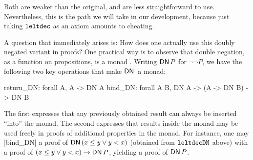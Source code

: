 \documentclass[runningheads]{llncs}
\newcommand{\Exists}[2]{\exists_{#1} \, . \, #2}
\newcommand{\weg}[1]{}
\newcommand{\DN}{{\sf DN}\,}
\newcommand{\IR}{{\mathbf R}}
\newcommand{\Inv}{{\rm Inv}}
\newcommand{\contrans}{\rightarrow_C}
\newcommand{\Dur}{{\IR_{\geq 0}}}
\newcommand{\leltdec}{{\tt leltdec}}
\newcommand{\leltdecDN}{{\tt leltdecDN}}
\begin{document}
Both are weaker than the original, and are less straightforward to
use. Nevertheless, this is the path we will take in our development,
because just taking $\leltdec$ as an axiom amounts to cheating.
\weg{ 
A place where we definitely need the stability of the invariant is in
proving the obvious and useful property of {\em transitivity of the
  continuous transition relation}: Suppose we have $(l, p) \contrans
(l, p')$ and $(l, p')\contrans (l, p'')$ for location $l$ and points
$p, p', p''$. 
To show $(l, p)\contrans (l, p'')$, we must show (among other things)
that the invariant holds at each point along the way. That is,
$$\forall t, 0 \leq t \leq d + d' \rightarrow \Inv_l( \Phi_L(p, t)).$$
We know this is true for $0 \leq t \leq d$, and we know that this is
true for $d \leq t \leq d + d'$. Classically, then, the proof is done,
for one can simply distinguish cases $t \leq d$ or $d < t$.  In our
transitivity proof, we will use the variant expressed using double
negation. Now we need only observe that $x \leq y$ is equivalent to $\neg(y < x)$, and that the law of the excluded middle holds under double negation. That is,
$\forall P( \neg  \neg  (P \vee \neg  P))$
is a trivial tautology.
}
A question that immediately arises is: How does one actually use this
doubly negated variant in proofs?  One practical way is to observe
that double negation, as a function on propositions, is a monad
\cite{wadler95monads}. Writing $\DN P$ for $\neg  \neg  P$, we have the following two key
operations that make $\DN$ a monad:

\begin{code}
  return_DN: forall A, A -> DN A
  bind_DN: forall A B, DN A -> (A -> DN B) -> DN B
\end{code}

The first expresses that any previously obtained result can always be
inserted ``into'' the monad. The second expresses that results inside
the monad may be used freely in proofs of additional properties in the
monad. For instance, one may |bind_DN| a proof of $\DN (x \leq y \vee y < x)$
(obtained from $\leltdecDN$ above) with a proof of $(x \leq y \vee y < x) \rightarrow \DN P$, yielding a proof of $\DN P$.
 
\end{document}
